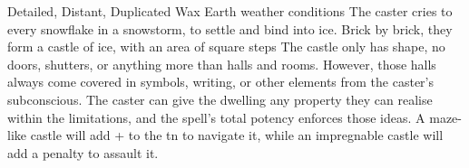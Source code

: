   {Detailed, Distant, Duplicated}%
  {Wax}%
  {Earth}%
  {weather conditions}%
  {The caster cries to every snowflake in a snowstorm, to settle and bind into ice.
    Brick by brick, they form a castle of ice, with an area of  square \glspl{step}}%
  {
    The castle only has shape, no doors, shutters, or anything more than halls and rooms.
    However, those halls always come covered in symbols, writing, or other elements from the caster's subconscious.
    The caster can give the dwelling any property they can realise within the limitations, and the spell's total potency enforces those ideas.
    A maze-like castle will add + to the \gls{tn} to navigate it, while an impregnable castle will add a penalty to assault it.
  }

